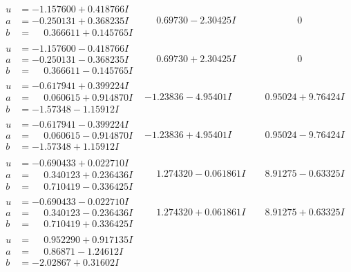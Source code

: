 \documentclass[1p]{elsarticle_modified}
\theoremstyle{definition}
\begin{document}
$$\begin{array}{c|c|c}
\begin{aligned}
u &= -1.157600 + 0.418766 I \\
a &= -0.250131 + 0.368235 I \\
b &= \phantom{-}0.366611 + 0.145765 I\end{aligned}
 & \phantom{-}0.69730 - 2.30425 I & \phantom{-0.000000 } 0 \\ \hline\begin{aligned}
u &= -1.157600 - 0.418766 I \\
a &= -0.250131 - 0.368235 I \\
b &= \phantom{-}0.366611 - 0.145765 I\end{aligned}
 & \phantom{-}0.69730 + 2.30425 I & \phantom{-0.000000 } 0 \\ \hline\begin{aligned}
u &= -0.617941 + 0.399224 I \\
a &= \phantom{-}0.060615 + 0.914870 I \\
b &= -1.57348 - 1.15912 I\end{aligned}
 & -1.23836 - 4.95401 I & \phantom{-}0.95024 + 9.76424 I \\ \hline\begin{aligned}
u &= -0.617941 - 0.399224 I \\
a &= \phantom{-}0.060615 - 0.914870 I \\
b &= -1.57348 + 1.15912 I\end{aligned}
 & -1.23836 + 4.95401 I & \phantom{-}0.95024 - 9.76424 I \\ \hline\begin{aligned}
u &= -0.690433 + 0.022710 I \\
a &= \phantom{-}0.340123 + 0.236436 I \\
b &= \phantom{-}0.710419 - 0.336425 I\end{aligned}
 & \phantom{-}1.274320 - 0.061861 I & \phantom{-}8.91275 - 0.63325 I \\ \hline\begin{aligned}
u &= -0.690433 - 0.022710 I \\
a &= \phantom{-}0.340123 - 0.236436 I \\
b &= \phantom{-}0.710419 + 0.336425 I\end{aligned}
 & \phantom{-}1.274320 + 0.061861 I & \phantom{-}8.91275 + 0.63325 I \\ \hline\begin{aligned}
u &= \phantom{-}0.952290 + 0.917135 I \\
a &= \phantom{-}0.86871 - 1.24612 I \\
b &= -2.02867 + 0.31602 I\end{aligned}

\end{array}$$
\end{document}
